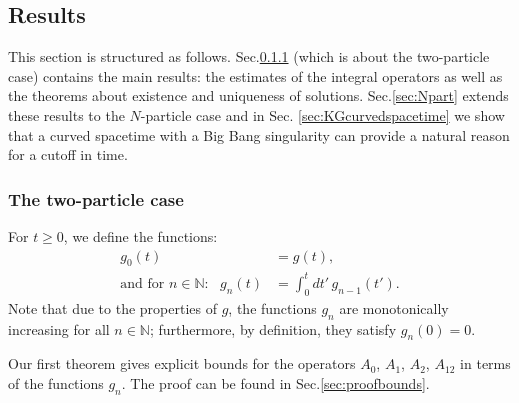\documentclass[b5paper,draft,openbib,12pt]{memoir}
\newcommand{\N}{\mathbb{N}}
\begin{document}
\subsection{Results}
\label{sec:KG results}

This section is structured as follows. Sec.\@ \ref{sec:2part} (which 
is about the two-particle case) contains the main results: the 
estimates of the integral operators as well as the theorems about 
existence and uniqueness of solutions. Sec.\@ \ref{sec:Npart} 
extends these results to the $N$-particle case and in Sec.\@ 
\ref{sec:KGcurvedspacetime} we show that a curved spacetime with a 
Big Bang singularity can provide a natural reason for a cutoff in 
time.


\subsubsection{The two-particle case} \label{sec:2part}

For $t\geq0$, we define the functions:
\begin{align}
	g_0(t) &= g(t),\nonumber\\
\text{and for }n\in\N:~~~	g_n(t) &= \int_0^t dt' \, g_{n-1}(t').	
\end{align}
Note that due to the properties of $g$, the functions $g_n$ are 
monotonically increasing for all $n\in \N$; furthermore, by 
definition, they satisfy $g_n(0)=0$.

Our first theorem gives explicit bounds for the operators 
\(A_0\), \(A_1\), \(A_2\), \(A_{12}\) in terms of the functions $g_n$. 
The proof 
can be found in Sec.\@ \ref{sec:proofbounds}.
\end{document}

